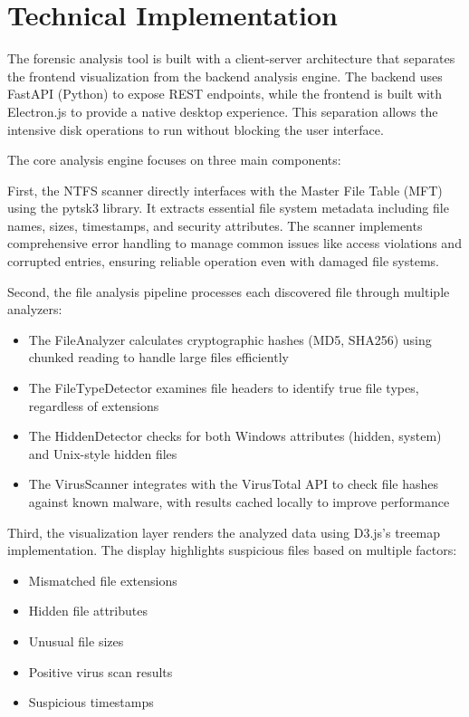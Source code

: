 \documentclass[a4paper,12pt]{article}
\begin{document}
\section*{Technical Implementation}

The forensic analysis tool is built with a client-server architecture that separates the frontend visualization from the backend analysis engine. The backend uses FastAPI (Python) to expose REST endpoints, while the frontend is built with Electron.js to provide a native desktop experience. This separation allows the intensive disk operations to run without blocking the user interface.

The core analysis engine focuses on three main components:

First, the NTFS scanner directly interfaces with the Master File Table (MFT) using the pytsk3 library. It extracts essential file system metadata including file names, sizes, timestamps, and security attributes. The scanner implements comprehensive error handling to manage common issues like access violations and corrupted entries, ensuring reliable operation even with damaged file systems.

Second, the file analysis pipeline processes each discovered file through multiple analyzers:
\begin{itemize}
    \item The FileAnalyzer calculates cryptographic hashes (MD5, SHA256) using chunked reading to handle large files efficiently
    \item The FileTypeDetector examines file headers to identify true file types, regardless of extensions
    \item The HiddenDetector checks for both Windows attributes (hidden, system) and Unix-style hidden files
    \item The VirusScanner integrates with the VirusTotal API to check file hashes against known malware, with results cached locally to improve performance
\end{itemize}

Third, the visualization layer renders the analyzed data using D3.js's treemap implementation. The display highlights suspicious files based on multiple factors:
\begin{itemize}
    \item Mismatched file extensions
    \item Hidden file attributes
    \item Unusual file sizes
    \item Positive virus scan results
    \item Suspicious timestamps
\end{itemize}
\end{document}
